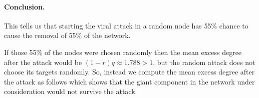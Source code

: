 \paragraph{Conclusion.}This tells us that starting the viral attack in a random node has 55\% chance to cause the removal of 55\% of the network. 

If those 55\% of the nodes were chosen randomly then the mean excess degree after the attack would be $(1-r)q\approx 1.788>1$, but the random attack does not choose its targets randomly. So, instead we compute the mean excess degree after the attack as follows 
which shows that the giant component in the network under consideration would not survive the attack. 
